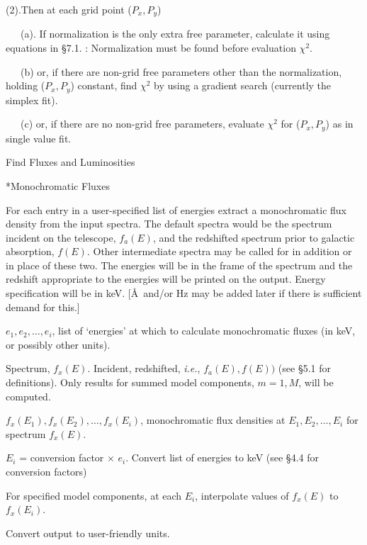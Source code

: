 {\listlist

(2).Then at each grid point ($P_x, P_y$)

~~~(a). If normalization is the only extra free parameter, calculate it
using equations in \S 7.1. :  Normalization
must be found before evaluation $\chi^{2}$.
 
~~~(b) or, if there are non-grid free parameters other than the normalization,
holding ($P_x,P_y$) constant,  find $\chi^{2}$ by using a gradient
search (currently the simplex fit).
 
~~~(c) or, if there are no non-grid free parameters,
evaluate $\chi^{2}$ for ($P_x,P_y$) as in single value fit.
 
}

\@{Find Fluxes and Luminosities}

 
\**Monochromatic Fluxes 

{\list


For each entry in a user-specified list of energies extract a
monochromatic flux density from the input spectra.  The default spectra
would be the spectrum incident on the telescope, $f_a(E)$, and the redshifted spectrum
prior to galactic absorption,  $f(E)$.  Other intermediate
spectra may be called
for in addition or in place of these two.  The energies will be in the frame
of the spectrum and the redshift appropriate to the energies will be
printed on the output.  Energy specification will be in keV.
[\AA~and/or Hz may
be added later if there is sufficient demand for this.]


$e_1, e_2,\ldots,e_i$, list of `energies' at which to
calculate monochromatic fluxes (in keV, or possibly other units).

Spectrum, $f_{x}(E)$.  Incident, redshifted,
{\it i.e.}, $f_a(E), f(E))$
(see \S5.1 for definitions).  Only results for summed model components,
$m=1,M$, will be computed. 

 
$f_x(E_1), f_x(E_2), \ldots, f_x(E_i)$, monochromatic flux densities
at $E_1, E_2, \ldots, E_i$ for spectrum $f_x(E)$.


$E_i$ = conversion factor $\times$ $e_i$.  Convert list of energies to keV (see
\S4.4 for conversion factors)

For specified model components, at each $E_i$, interpolate
values of $f_{x}(E)$ to $f_{x}(E_i)$.

Convert output to user-friendly units.

}
 
